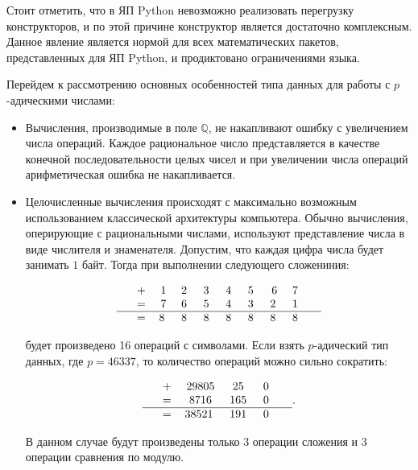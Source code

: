 \documentclass[master, och, diploma, times]{sty/SCWorks}
\theoremstyle{plain}
\theoremstyle{definition}
\numberwithin{equation}{section}
\begin{document}
Стоит отметить, что в ЯП Python невозможно реализовать перегрузку конструкторов, и по этой причине конструктор является достаточно комплексным. Данное явление является нормой для всех математических пакетов, представленных для ЯП Python, и продиктовано ограничениями языка.


Перейдем к рассмотрению основных особенностей типа данных для работы с $p$-адическими числами:

\begin{itemize}

\item Вычисления, производимые в поле $\mathbb{Q}$, не накапливают ошибку с увеличением числа операций. Каждое рациональное число представляется в качестве конечной последовательности целых чисел и при увеличении числа операций арифметическая ошибка не накапливается\cite{bib:computation:gregory}.

\item Целочисленные вычисления происходят с максимально возможным использованием классической архитектуры компьютера. Обычно вычисления, оперирующие с рациональными числами, используют представление числа в виде числителя и знаменателя. Допустим, что каждая цифра числа будет занимать $1$ байт. Тогда при выполнении следующего сложениния:

$$
\begin{tabular}{ccccccccccc}
& + & 1 & 2\; & 3\; & 4\; & 5\; & 6 & 7\; &  \\
& = & 7 & 6\; & 5\; & 4\; & 3\; & 2\; & 1\; &  \\
\hline
& = & 8\; & 8\; & 8\; & 8\; & 8\; & 8\; & 8\; &
\end{tabular}
$$

будет произведено 16 операций с символами. Если взять $p$-адический тип данных, где $p=46337$, то количество операций можно сильно сократить:

$$
\begin{tabular}{ccccccccccc}
& + & 29805 & 25\; & 0\; &  \\
& = & 8716 & 165\; & 0\; & \\
\hline
& = & 38521\; & 191\; & 0\; &
\end{tabular}.
$$

В данном случае будут произведены только $3$ операции сложения и $3$ операции сравнения по модулю.


\end{itemize}
\end{document}

